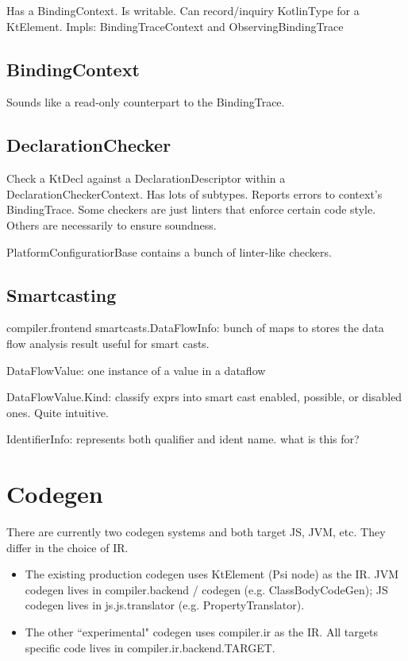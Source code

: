\documentclass{article}
\begin{document}
Has a BindingContext. Is writable. Can record/inquiry KotlinType for a KtElement.
Impls: BindingTraceContext and ObservingBindingTrace

\subsection{BindingContext}

Sounds like a read-only counterpart to the BindingTrace.

\subsection{DeclarationChecker}

Check a KtDecl against a DeclarationDescriptor within a DeclarationCheckerContext. Has lots of subtypes. Reports errors to context's BindingTrace. Some checkers are just linters that enforce certain code style. Others are necessarily to ensure soundness.

PlatformConfiguratiorBase contains a bunch of linter-like checkers.

\subsection{Smartcasting}

compiler.frontend smartcasts.DataFlowInfo: bunch of maps to stores the data flow analysis result useful for smart casts.

DataFlowValue: one instance of a value in a dataflow

DataFlowValue.Kind: classify exprs into smart cast enabled, possible, or disabled ones. Quite intuitive.

IdentifierInfo: represents both qualifier and ident name. what is this for?

\section{Codegen}

There are currently two codegen systems and both target JS, JVM, etc. They differ in the choice of IR.

\begin{itemize}
    \item The existing production codegen uses KtElement (Psi node) as the IR. JVM codegen lives in compiler.backend / codegen (e.g. ClassBodyCodeGen); JS codegen lives in js.js.translator (e.g. PropertyTranslator).
    \item The other ``experimental" codegen uses compiler.ir as the IR. All targets specific code lives in compiler.ir.backend.TARGET.
\end{itemize}
\end{document}
